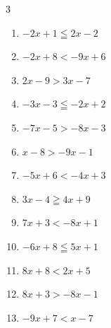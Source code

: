 \begin{multicols}{3}
\begin{enumerate}

  \item $-2x+1\leqq 2x-2$


  \item $-2x+8<-9x+6$


  \item $2x-9>3x-7$

        \phantom{$\displaystyle x<-2$}

  \item $-3x-3\leqq -2x+2$

        \phantom{$\displaystyle x\geqq -5$}

  \item $-7x-5>-8x-3$

        \phantom{$\displaystyle x>2$}

  \item $x-8>-9x-1$


  \item $-5x+6<-4x+3$

        \phantom{$\displaystyle x>3$}

  \item $3x-4\geqq 4x+9$

        \phantom{$\displaystyle x\leqq -13$}

  \item $7x+3<-8x+1$


  \item $-6x+8\leqq 5x+1$


\columnbreak %

  \item $8x+8<2x+5$


  \item $8x+3>-8x-1$


  \item $-9x+7<x-7$



\end{enumerate}
\end{multicols}
